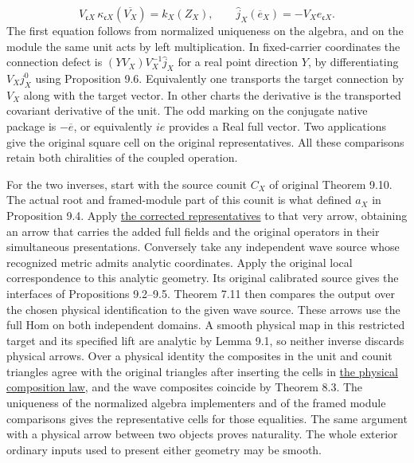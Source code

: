 \documentclass[
  english,
  11pt,
  reqno]{amsart}
\begin{document}
\label{eq:analytic-wave-coupled-square} \[
V_{\mathfrak c X}\,\kappa_{\mathfrak cX}(\overline{V_X})=k_X(Z_X),
\qquad
\widehat j_X(\overline e_X)=-V_X e_{\mathfrak c X}.
\] The first equation follows from normalized uniqueness on the algebra,
and on the module the same unit acts by left multiplication. In
fixed-carrier coordinates the connection defect is
\((YV_X)V_X^{-1}\widehat j_X\) for a real point direction \(Y\), by
differentiating \(V_Xj_X^0\) using Proposition 9.6. Equivalently one
transports the target connection by \(V_X\) along with the target
vector. In other charts the derivative is the transported covariant
derivative of the unit. The odd marking on the conjugate native package
is \(-\overline e\), or equivalently \(ie\) provides a Real full vector.
Two applications give the original square cell on the original
representatives. All these comparisons retain both chiralities of the
coupled operation.

For the two inverses, start with the source counit \(C_X\) of original
Theorem 9.10. The actual root and framed-module part of this counit is
what defined \(a_X\) in Proposition 9.4. Apply
\hyperref[eq:analytic-formal-representatives]{the corrected
representatives} to that very arrow, obtaining an arrow that carries the
added full fields and the original operators in their simultaneous
presentations. Conversely take any independent wave source whose
recognized metric admits analytic coordinates. Apply the original local
correspondence to this analytic geometry. Its original calibrated source
gives the interfaces of Propositions 9.2--9.5. Theorem 7.11 then
compares the output over the chosen physical identification to the given
wave source. These arrows use the full Hom on both independent domains.
A smooth physical map in this restricted target and its specified lift
are analytic by Lemma 9.1, so neither inverse discards physical arrows.
Over a physical identity the composites in the unit and counit triangles
agree with the original triangles after inserting the cells in
\hyperref[eq:analytic-physical-cells]{the physical composition law}, and
the wave composites coincide by Theorem 8.3. The uniqueness of the
normalized algebra implementers and of the framed module comparisons
gives the representative cells for those equalities. The same argument
with a physical arrow between two objects proves naturality. The whole
exterior ordinary inputs used to present either geometry may be smooth.
\end{document}
